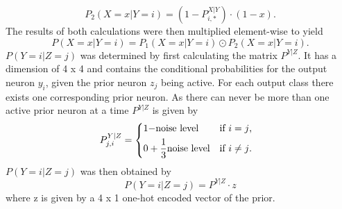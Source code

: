 \begin{equation}
\label{eqn:p2minusXvorausgesetztYMalX}
P_2(X = x|Y = i) = (1 - P^{X|Y}_{i,*}) \cdot (1 - x).
\end{equation}
The results of both calculations were then multiplied element-wise to yield
\begin{equation}
\label{eqn:pXvorausgesetztY}
P(X = x|Y = i) = P_1(X = x|Y = i) \odot P_2(X = x|Y = i).
\end{equation}
$P(Y=i|Z=j)$ was determined by first calculating the matrix $P^{Y|Z}$. It has a dimension of 4 x 4 and contains the conditional probabilities for the output neuron $y_i$, given the prior neuron $z_j$ being active. For each output class there exists one corresponding prior neuron. As there can never be more than one active prior neuron at a time $P^{Y|Z}$ is given by
\begin{equation}
\label{eqn:PYvorausgesetztZIf}
P_{j,i}^{Y|Z} = \begin{dcases*} 1 - $noise level$ & if $i = j$, \\
0 +  \frac{1}{3}  $noise level$ & \text{if $i \neq j$. } \end{dcases*}\end{equation} 
$P(Y=i|Z=j)$ was then obtained by
\begin{equation}
\label{eqn:pYvorausgesetztZ}
P(Y=i|Z=j) = P^{Y|Z} \cdot z
\end{equation}
where z is given by a 4 x 1 one-hot encoded vector of the prior.

